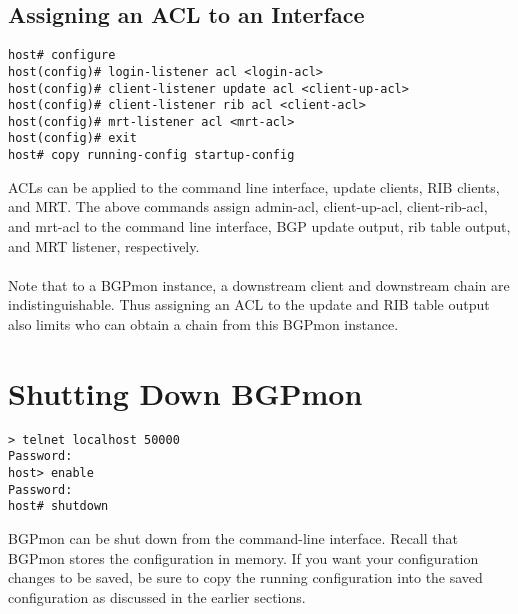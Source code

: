 \documentclass{article}
\begin{document}
\subsection{Assigning an ACL to an Interface}
\begin{Verbatim}[frame=single]
host# configure
host(config)# login-listener acl <login-acl>
host(config)# client-listener update acl <client-up-acl>
host(config)# client-listener rib acl <client-acl>
host(config)# mrt-listener acl <mrt-acl>
host(config)# exit
host# copy running-config startup-config
\end{Verbatim}
ACLs can be applied to the command line interface,  update clients,  RIB clients, and MRT.  The above commands assign admin-acl, client-up-acl, client-rib-acl, and mrt-acl to the command line interface,  BGP update output,  rib table output, and MRT listener, respectively.  
\\
\\
Note that to a BGPmon instance,  a downstream client and downstream chain are indistinguishable.    Thus assigning an ACL to the update and RIB table output also limits who can obtain a chain from this BGPmon instance. 

\section{Shutting Down BGPmon}
\begin{Verbatim}[frame=single]
> telnet localhost 50000
Password:
host> enable
Password:
host# shutdown
\end{Verbatim}
BGPmon can be shut down from the command-line interface.   Recall that BGPmon stores the configuration in memory.   If you want your configuration changes to be saved,  be sure to copy the running configuration into the saved configuration as discussed in the earlier sections.  
\end{document}
